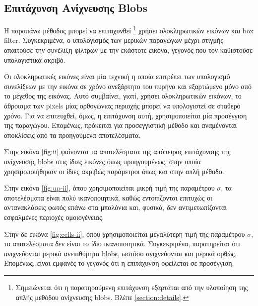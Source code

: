 \documentclass{article}
\newcommand{\eng}[1]{\foreignlanguage{english}{#1}}
\begin{document}
\subsection{Επιτάχυνση Ανίχνευσης \eng{Blobs}}

Η παραπάνω μέθοδος μπορεί να επιταχυνθεί \footnote{Σημειώνεται ότι η παρατηρούμενη επιτάχυνση εξαρτάται από την υλοποίηση της απλής μεθόδου ανίχνευσης \eng{blobs}. Βλέπε \ref{section:details}.} χρήσει ολοκληρωτικών εικόνων και \eng{box filter}. Συγκεκριμένα, ο υπολογισμός των μερικών παραγώγων μέχρι στιγμής απαιτούσε την συνέλιξη φίλτρων με την εκάστοτε εικόνα, γεγονός που τον καθιστούσε υπολογιστικά ακριβό.

Οι ολοκληρωτικές εικόνες είναι μία τεχνική η οποία επιτρέπει των υπολογισμό συνελίξεων με την εικόνα σε χρόνο ανεξάρτητο του πυρήνα και εξαρτώμενο μόνο από το μέγεθος της εικόνας. Αυτό συμβαίνει, γιατί, χρήσει ολοκληρωτικών εικόνων, το άθροισμα των \eng{pixels} μίας ορθογώνιας περιοχής μπορεί να υπολογιστεί σε σταθερό χρόνο. Για να επιτευχθεί, όμως, η επιτάχυνση αυτή, χρησιμοποιείται μία προσέγγιση της παραγώγου. Επομένως, πρόκειται για προσεγγιστική μέθοδο και αναμένονται αποκλίσεις από τα προηγούμενα αποτελέσματα.

Στην εικόνα \ref{fig:ii} φαίνονται τα αποτελέσματα της απόπειρας επιτάχυνσης της ανίχνευσης \eng{blobs} στις ίδιες εικόνες όπως προηγουμένως, στην οποία χρησιμοποιήθηκαν οι ίδιες ακριβώς παράμετροι όπως και στην απλή μέθοδο.

Στην εικόνα \ref{fig:up-ii}, όπου χρησιμοποιείται μικρή τιμή της παραμέτρου $\sigma$, τα αποτελέσματα είναι πολύ ικανοποιητικά, καθώς εντοπίζονται επιτυχώς οι αντανακλάσεις φωτός επάνω στα μπαλόνια και, φυσικά, δεν αντιμετωπίζονται εσφαλμένες περιοχές ομοιογένειας.

Στην δε εικόνα \ref{fig:cells-ii}, όπου χρησιμοποιείται μεγαλύτερη τιμή της παραμέτρου  $\sigma$, τα αποτελέσματα δεν είναι το ίδιο ικανοποιητικά. Συγκεκριμένα, παρατηρείται ότι ανιχνεύονται μερικά ανεπιθύμητα \eng{blobs}, ωστόσο ανιχνεύονται και μερικά ορθώς. Επομένως, είναι εμφανές το γεγονός ότι η επιτάχυνση οφείλεται σε προσέγγιση.
\end{document}
